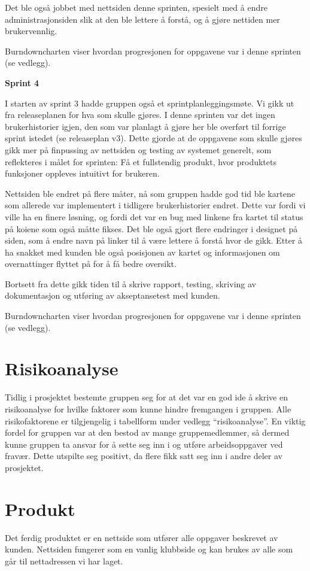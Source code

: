 \documentclass[12pt,a4paper,norsk]{article}
\begin{document}
Det ble også jobbet med nettsiden denne sprinten, spesielt med å endre administrasjonsiden slik at den ble lettere å forstå, og å gjøre nettiden mer brukervennlig.  

Burndowncharten viser hvordan progresjonen for oppgavene var i denne sprinten (se vedlegg).

\bigskip \noindent \textbf{Sprint 4}
\par I starten av sprint 3 hadde gruppen også et sprintplanleggingsmøte. Vi gikk ut fra releaseplanen for hva som skulle gjøres. I denne sprinten var det ingen brukerhistorier igjen, den som var planlagt å gjøre her ble overført til forrige sprint istedet (se releaseplan v3). Dette gjorde at de oppgavene som skulle gjøres gikk mer på finpussing av nettsiden og testing av systemet generelt, som reflekteres i målet for sprinten: Få et fullstendig produkt, hvor produktets funksjoner oppleves intuitivt for brukeren.

Nettsiden ble endret på flere måter, nå som gruppen hadde god tid ble kartene som allerede var implementert i tidligere brukerhistorier endret. Dette var fordi vi ville ha en finere løsning, og fordi det var en bug med linkene fra kartet til status på koiene som også måtte fikses. Det ble også gjort flere endringer i designet på siden, som å endre navn på linker til å være lettere å forstå hvor de gikk. Etter å ha snakket med kunden ble også posisjonen av kartet og informasjonen om overnattinger flyttet på for å få bedre oversikt. 

Bortsett fra dette gikk tiden til å skrive rapport, testing, skriving av dokumentasjon og utføring av akseptansetest med kunden. 

Burndowncharten viser hvordan progresjonen for oppgavene var i denne sprinten (se vedlegg).

	
	\section{Risikoanalyse}
	Tidlig i prosjektet bestemte gruppen seg for at det var en god ide å skrive en risikoanalyse for hvilke faktorer som kunne hindre fremgangen i gruppen. Alle risikofaktorene er tilgjengelig i tabellform under vedlegg “risikoanalyse”. En viktig fordel for gruppen var at den bestod av mange gruppemedlemmer, så dermed kunne gruppen ta ansvar for å sette seg inn i og utføre arbeidsoppgaver ved fravær. Dette utspilte seg positivt, da flere fikk satt seg inn i andre deler av prosjektet.
	
	\section{Produkt}
	Det ferdig produktet er en nettside som utfører alle oppgaver beskrevet av kunden. Nettsiden fungerer som en vanlig klubbside og kan brukes av alle som går til nettadressen vi har laget.
	
\end{document}
